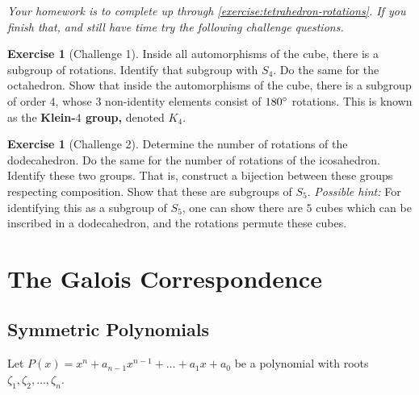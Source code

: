 \documentclass[reqno, 12pt, letter]{article}
\theoremstyle{plain}
\theoremstyle{definition}
\newtheorem{exercise}[theorem]{Exercise}
\theoremstyle{remark}
\numberwithin{equation}{section}
\begin{document}
{\it Your homework is to complete up through \autoref{exercise:tetrahedron-rotations}. If you finish that, and still have time try the following challenge questions.}

\begin{exercise}[Challenge 1]
	\label{exercise:}
	Inside all automorphisms of the cube, there is a subgroup of rotations. Identify that subgroup with $S_4$.
	Do the same for the octahedron.
	Show that inside the automorphisms of the cube, there is a subgroup of order $4$, whose $3$ non-identity elements consist of $180 \degree$ rotations.
	This is known as the {\bf Klein-$4$ group,} denoted $K_4$.
\end{exercise}
\begin{exercise}[Challenge 2]
	\label{exercise:}
	Determine the number of rotations of the dodecahedron. Do the same for the number of rotations of the icosahedron.
	Identify these two groups. That is, construct a bijection between these groups respecting composition.
	Show that these are subgroups of $S_5$. 
	{\it Possible hint:} For identifying this as a subgroup of $S_5$,
	one can show there are $5$ cubes which can be inscribed in a dodecahedron, and the rotations permute these cubes.
\end{exercise}




\newpage
\section{The Galois Correspondence}
	
	
	
	
	
	
	
	\subsection{Symmetric Polynomials}	
	
	Let $ P(x) = x^n + a_{n-1} x^{n-1} + \dots + a_1 x + a_0$ be a polynomial with roots $ \zeta_1, \zeta_2, \dots, \zeta_n$.
	
\end{document}

